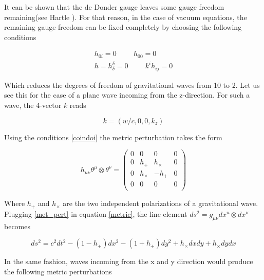 It can be shown that the de Donder gauge leaves some gauge freedom remaining(see Hartle \cite[chapter X]{Hartle:2021pel}). For that reason, in the case of vacuum equations, the remaining gauge freedom can be fixed completely by choosing the following conditions

\begin{equation}\label{coindoi}
\begin{gathered}
h_{0i} = 0  \hspace{1cm} h_{00} = 0 \\
h = h^{\delta}_{\delta} = 0  \hspace{1cm} k^{i}h_{ij} = 0
\end{gathered}
\end{equation}

Which reduces the degrees of freedom of gravitational waves from 10 to 2. Let us see this for the case of a plane wave incoming from the z-direction. For such a wave, the 4-vector $k$ reads

\begin{equation}
k = (w/c, 0,0,k_z)
\end{equation}

Using the conditions \ref{coindoi} the metric perturbation takes the form 

\begin{equation}\label{met_pert}
h_{\mu \nu} \theta^\mu \otimes \theta^\nu = 
\begin{pmatrix}
0&0&0&0 \\
0&h_+ &h_\times &0 \\
0&h_\times &-h_+ &0 \\
0&0&0&0 \\
\end{pmatrix} 
\end{equation}

Where $h_+$ and $h_\times$ are the two independent polarizations of a gravitational wave. Plugging \ref{met_pert} in equation \ref{metric}, the line element $ds^2 = g_{\mu \nu} dx^u \otimes dx^\nu$ becomes 


\begin{equation}\label{GWlineelement}
ds^2 = c^2 dt^2 - (1-h_+) dx^2 - (1+h_+) dy^2 + h_\times dxdy + h_\times dydx
\end{equation}

In the same fashion, waves incoming from the x and y direction would produce the following metric perturbations

